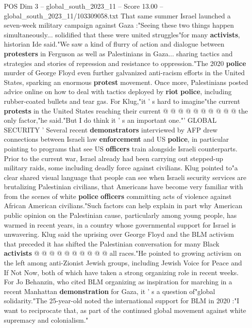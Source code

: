 \begin{textsample}{POS Dim 3 – global\_south\_2023\_11 – Score 13.00 – global\_south\_2023\_11/103309058.txt}
That same summer Israel launched a seven-week military campaign against Gaza :"Seeing these two things happen simultaneously... solidified that these were united struggles"for many \textbf{activists}, historian Ide said."We saw a kind of flurry of action and dialogue between \textbf{protesters} in Ferguson as well as Palestinians in Gaza... sharing tactics and strategies and stories of repression and resistance to oppression."The 2020 \textbf{police} murder of George Floyd even further galvanized anti-racism efforts in the United States, sparking an enormous \textbf{protest} movement.
Once more, Palestinians posted advice online on how to deal with tactics deployed by \textbf{riot} \textbf{police}, including rubber-coated bullets and tear gas.
For Klug,"it ' s hard to imagine"the current \textbf{protests} in the United States reaching their current @ @ @ @ @ @ @ @ @ @ the only factor,"he said."But I do think it ' s an important one."' GLOBAL SECURITY ' Several recent \textbf{demonstrators} interviewed by AFP drew connections between Israeli law \textbf{enforcement} and US \textbf{police}, in particular pointing to programs that see US \textbf{officers} train alongside Israeli counterparts.
Prior to the current war, Israel already had been carrying out stepped-up military raids, some including deadly force against civilians.
Klug pointed to"a clear shared visual language that people can see when Israeli security services are brutalizing Palestinian civilians, that Americans have become very familiar with from the scenes of white \textbf{police} \textbf{officers} committing acts of violence against African American civilians."Such factors can help explain in part why American public opinion on the Palestinian cause, particularly among young people, has warmed in recent years, in a country whose governmental support for Israel is unwavering.
Klug said the uprising over George Floyd and the BLM activism that preceded it has shifted the Palestinian conversation for many Black \textbf{activists} @ @ @ @ @ @ @ @ @ @ all races."He pointed to growing activism on the left among anti-Zionist Jewish groups, including Jewish Voice for Peace and If Not Now, both of which have taken a strong organizing role in recent weeks.
For Jo Behanzin, who cited BLM organizing as inspiration for marching in a recent Manhattan \textbf{demonstration} for Gaza, it ' s a question of"global solidarity."The 25-year-old noted the international support for BLM in 2020 :"I want to reciprocate that, as part of the continued global movement against white supremacy and colonialism."

\end{textsample}

